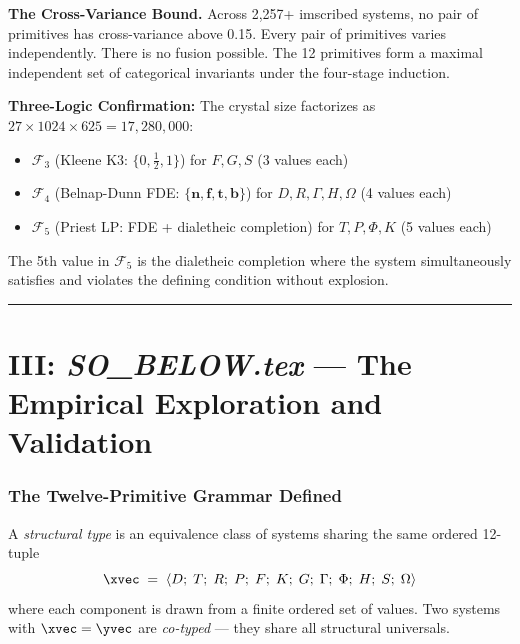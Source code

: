\documentclass[12pt,a4paper]{article}
\begin{document}
\textbf{The Cross-Variance Bound.}
Across 2,257+ imscribed systems, no pair of primitives has cross-variance above 0.15. Every pair of primitives varies independently. There is no fusion possible. The 12 primitives form a maximal independent set of categorical invariants under the four-stage induction.

\textbf{Three-Logic Confirmation:}
The crystal size factorizes as $27 \times 1024 \times 625 = 17,280,000$:
\begin{itemize}
    \item $\mathcal{F}_3$ (Kleene K3: $\{0, \frac12, 1\}$) for $F, G, S$ (3 values each)
    \item $\mathcal{F}_4$ (Belnap-Dunn FDE: $\{\mathbf{n}, \mathbf{f}, \mathbf{t}, \mathbf{b}\}$) for $D, R, \Gamma, H, \Omega$ (4 values each)
    \item $\mathcal{F}_5$ (Priest LP: FDE + dialetheic completion) for $T, P, \Phi, K$ (5 values each)
\end{itemize}
The 5th value in $\mathcal{F}_5$ is the dialetheic completion where the system simultaneously satisfies and violates the defining condition without explosion.

\begin{center}
\rule{0.5\textwidth}{0.4pt}
\end{center}

\part{III: \textit{SO\_BELOW.tex} --- The Empirical Exploration and Validation}
\label{part:iii}

\section{The Twelve-Primitive Grammar Defined}

A \emph{structural type} is an equivalence class of systems sharing the same ordered 12-tuple
\[
\xvec \;=\; \langle D;\; T;\; R;\; P;\; F;\; K;\; G;\; \Gamma;\; \Phi;\; H;\; S;\; \Omega \rangle
\]
where each component is drawn from a finite ordered set of values. Two systems with $\xvec = \yvec$ are \emph{co-typed} --- they share all structural universals.
\end{document}
